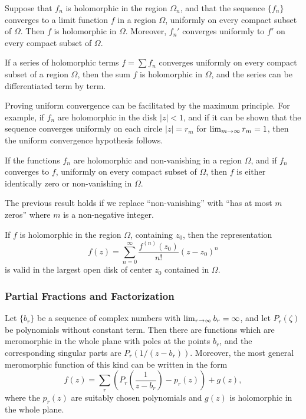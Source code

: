 \begin{theorem}
  Suppose that $f_n$ is holomorphic in the region $\Omega_n$, and that the sequence $\{f_n\}$ converges to a limit function $f$ in a region $\Omega$, uniformly on every compact subset of $\Omega$. Then $f$ is holomorphic in $\Omega$. Moreover, $f_n'$ converges uniformly to $f'$ on every compact subset of $\Omega$.
\end{theorem}

\begin{corollary}
  If a series of holomorphic terms $f = \sum f_n$ converges uniformly on every compact subset of a region $\Omega$, then the sum $f$ is holomorphic in $\Omega$, and the series can be differentiated term by term.
\end{corollary}

Proving uniform convergence can be facilitated by the maximum principle. For example, if $f_n$ are holomorphic in the disk $|z| < 1$, and if it can be shown that the sequence converges uniformly on each circle $|z| = r_m$ for $\lim_{m \rightarrow \infty} r_m = 1$, then the uniform convergence hypothesis follows.

\begin{theorem}
  If the functions $f_n$ are holomorphic and non-vanishing in a region $\Omega$, and if $f_n$ converges to $f$, uniformly on every compact subset of $\Omega$, then $f$ is either identically zero or non-vanishing in $\Omega$.
\end{theorem}

\begin{remark}
  The previous result holds if we replace ``non-vanishing'' with ``has at most $m$ zeros'' where $m$ is a non-negative integer.
\end{remark}

\begin{theorem}
  If $f$ is holomorphic in the region $\Omega$, containing $z_0$, then the representation
  \[
  f(z) = \sum_{n=0}^\infty \frac{f^{(n)}(z_0)}{n!} (z-z_0)^n
  \]
  is valid in the largest open disk of center $z_0$ contained in $\Omega$.
\end{theorem}

\subsubsection{Partial Fractions and Factorization}

\begin{theorem}
  Let $\{b_r\}$ be a sequence of complex numbers with $\lim_{r \rightarrow \infty} b_r = \infty$, and let $P_r(\zeta)$ be polynomials without constant term. Then there are functions which are meromorphic in the whole plane with poles at the points $b_r$, and the corresponding singular parts are $P_r(1/(z-b_r))$. Moreover, the most general meromorphic function of this kind can be written in the form
  \[
  f(z) = \sum_r \left( P_r\left( \frac{1}{z-b_r} \right) - p_r(z) \right) + g(z),
  \]
  where the $p_r(z)$ are suitably chosen polynomials and $g(z)$ is holomorphic in the whole plane.
\end{theorem}


